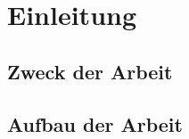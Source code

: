 \chapter{Einleitung}
\label{ch:introduction}

\blindtext

\section{Zweck der Arbeit}
\label{sec:introduction:purpose}

\blindtext

\section{Aufbau der Arbeit}
\label{sec:introduction:structure}

\blindtext